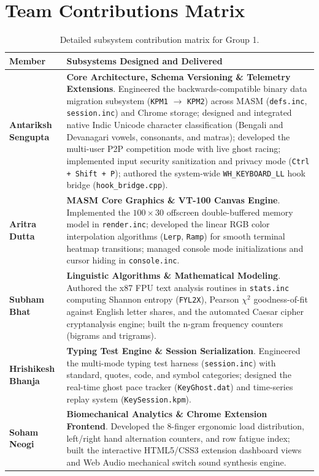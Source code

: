\documentclass[11pt,a4paper]{article}
\begin{document}
\section{Team Contributions Matrix}

\begin{table}[htbp]
\centering
\small
\begin{tabularx}{\textwidth}{lX}
  \toprule
  \textbf{Member} & \textbf{Subsystems Designed and Delivered} \\
  \midrule
  \textbf{Antariksh Sengupta} &
  \textbf{Core Architecture, Schema Versioning \& Telemetry Extensions}.
  Engineered the backwards-compatible binary data migration subsystem (\texttt{KPM1} $\rightarrow$ \texttt{KPM2}) across MASM (\texttt{defs.inc}, \texttt{session.inc}) and Chrome storage; designed and integrated native Indic Unicode character classification (Bengali and Devanagari vowels, consonants, and matras); developed the multi-user P2P competition mode with live ghost racing; implemented input security sanitization and privacy mode (\texttt{Ctrl + Shift + P}); authored the system-wide \texttt{WH\_KEYBOARD\_LL} hook bridge (\texttt{hook\_bridge.cpp}). \\
  \addlinespace
  \textbf{Aritra Dutta} &
  \textbf{MASM Core Graphics \& VT-100 Canvas Engine}.
  Implemented the $100 \times 30$ offscreen double-buffered memory model in \texttt{render.inc}; developed the linear RGB color interpolation algorithms (\texttt{Lerp}, \texttt{Ramp}) for smooth terminal heatmap transitions; managed console mode initializations and cursor hiding in \texttt{console.inc}. \\
  \addlinespace
  \textbf{Subham Bhat} &
  \textbf{Linguistic Algorithms \& Mathematical Modeling}.
  Authored the x87 FPU text analysis routines in \texttt{stats.inc} computing Shannon entropy (\texttt{FYL2X}), Pearson $\chi^2$ goodness-of-fit against English letter shares, and the automated Caesar cipher cryptanalysis engine; built the n-gram frequency counters (bigrams and trigrams). \\
  \addlinespace
  \textbf{Hrishikesh Bhanja} &
  \textbf{Typing Test Engine \& Session Serialization}.
  Engineered the multi-mode typing test harness (\texttt{session.inc}) with standard, quotes, code, and symbol categories; designed the real-time ghost pace tracker (\texttt{KeyGhost.dat}) and time-series replay system (\texttt{KeySession.kpm}). \\
  \addlinespace
  \textbf{Soham Neogi} &
  \textbf{Biomechanical Analytics \& Chrome Extension Frontend}.
  Developed the 8-finger ergonomic load distribution, left/right hand alternation counters, and row fatigue index; built the interactive HTML5/CSS3 extension dashboard views and Web Audio mechanical switch sound synthesis engine. \\
  \bottomrule
\end{tabularx}
\caption{Detailed subsystem contribution matrix for Group 1.}
\label{tab:contributions}
\end{table}
\end{document}
